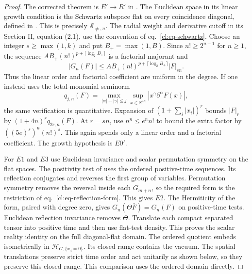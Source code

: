 \documentclass[11pt,letterpaper,reqno]{amsart}
\numberwithin{equation}{section}
\renewcommand{\eqref}[1]{\textup{eq.~\ref{#1}}}
\theoremstyle{definition}
\theoremstyle{remark}
\begin{document}
\begin{proof}
The corrected theorem is \(E'\to R'\) in
\cite[Section IV.1, pp.~287--288, equation (4.1)]{OS75}.
The Euclidean space in its linear growth condition is the
Schwartz subspace flat on every coincidence diagonal,
defined in \cite[Section II, p.~284]{OS75}. This is precisely
\(\mathcal S_{\ne,n}\). The radial weight and derivative cutoff in its
Section II, equation (2.1), use the convention of
\eqref{cl:eq-schwartz}. Choose an integer \(s\ge \max(1,k)\) and put \(B_+=\max(1,B)\).
Since \(n!\ge 2^{n-1}\) for \(n\ge1\), the sequence
\(A B_+ (n!)^{p+\lceil\log_2B_+\rceil}\) is a factorial
majorant and
\[
 |G_n(F)|
 \le A B_+(n!)^{p+\lceil\log_2B_+\rceil}|F|_{sn}.
\]
Thus the linear order and factorial coefficient are uniform
in the degree. If one instead uses the total-monomial
seminorm
\[
 q_{j,n}(F)=
 \max_{|\alpha|+|\gamma|\le j}
      \sup_{x\in\mathbb R^{4n}}|x^\gamma\partial^\alpha F(x)|,
\]
the same verification is quantitative. Expansion of
\((1+\sum_i|x_i|)^r\) bounds \(|F|_r\) by
\((1+4n)^r q_{2r,n}(F)\).
At \(r=sn\), use \(n^n\le e^n n!\) to bound the extra
factor by \(((5e)^s)^n(n!)^s\).
This again spends only a linear order and a factorial
coefficient. The growth hypothesis is \(E0'\).

For \(E1\) and \(E3\) use Euclidean invariance and scalar
permutation symmetry on the flat spaces. The positivity
test of \cite[Sections 2--3, pp.~86--88]{OS73} uses the
ordered positive-time sequences. Its reflection conjugates
and reverses the first group of variables. Permutation
symmetry removes the reversal inside each \(G_{m+n}\),
so the required form is the restriction of
\eqref{cl:eq-reflection-form}. This gives \(E2\).
The Hermiticity of the form, paired with degree zero, gives
\(G_n(\Theta\overline F)=\overline{G_n(F)}\) on positive-time
tests. Euclidean reflection invariance removes \(\Theta\).
Translate each compact separated tensor into positive time
and then use flat-test density. This proves the scalar
reality identity on the full diagonal-flat domain.
The ordered quotient embeds isometrically in
\(\mathcal H_{G,\{x_4=0\}}\). Its closed range contains
the vacuum. The spatial translations preserve strict time
order and act unitarily as shown below, so they preserve this
closed range. This comparison uses the ordered domain directly.


\end{proof}
\end{document}
